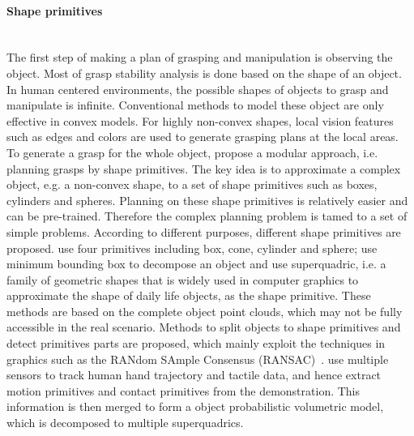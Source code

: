 \paragraph{Shape primitives}
\label{cha2:sec3:robotics:shapeprimitives}
~\\
The first step of making a plan of grasping and manipulation is observing the object. Most of grasp stability analysis is done based on the shape of an object. In human centered environments, the possible shapes of objects to grasp and manipulate is infinite. Conventional methods to model these object are only effective in convex models. For highly non-convex shapes, local vision features such as edges and colors are used to generate grasping plans at the local areas. To generate a grasp for the whole object, \citet{miller2003automatic} propose a modular approach, i.e. planning grasps by shape primitives. The key idea is to approximate a complex object, e.g. a non-convex shape, to a set of shape primitives such as boxes, cylinders and spheres. Planning on these shape primitives is relatively easier and can be pre-trained. Therefore the complex planning problem is tamed to a set of simple problems. According to different purposes, different shape primitives are proposed. \citet{miller2003automatic} use four primitives including box, cone, cylinder and sphere; \citet{huebner2008minimum} use minimum bounding box to decompose an object and \citet{el2010new} use superquadric, i.e. a family of geometric shapes that is widely used in computer graphics to approximate the shape of daily life objects, as the shape primitive. These methods are based on the complete object point clouds, which may not be fully accessible in the real scenario. Methods to split objects to shape primitives and detect primitives parts are proposed, which mainly exploit the techniques in graphics such as the RANdom SAmple Consensus (RANSAC)~\citep{garcia2009fitting,gallardo2011detection}.
\citet{faria2012extracting} use multiple sensors to track human hand trajectory and tactile data, and hence extract motion primitives and contact primitives from the demonstration. This information is then merged to form a object probabilistic volumetric model, which is decomposed to multiple superquadrics.

